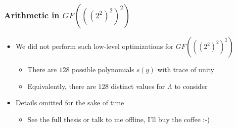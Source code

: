 \documentclass[handout,10pt]{beamer}
\begin{document}
\begin{frame}
	\frametitle{Arithmetic in $GF(((2^2)^2)^2)$}
	\begin{itemize}
		\item We did not perform such low-level optimizations for $GF(((2^2)^2)^2)$
		\begin{itemize}
			\item There are $128$ possible polynomials $s(y)$ with trace of unity
			\item Equivalently, there are $128$ distinct values for $\Lambda$ to consider
		\end{itemize}
		\item Details omitted for the sake of time
		\begin{itemize}
			\item See the full thesis or talk to me offline, I'll buy the coffee :-)
		\end{itemize}
	\end{itemize}
\end{frame}




\end{document}
